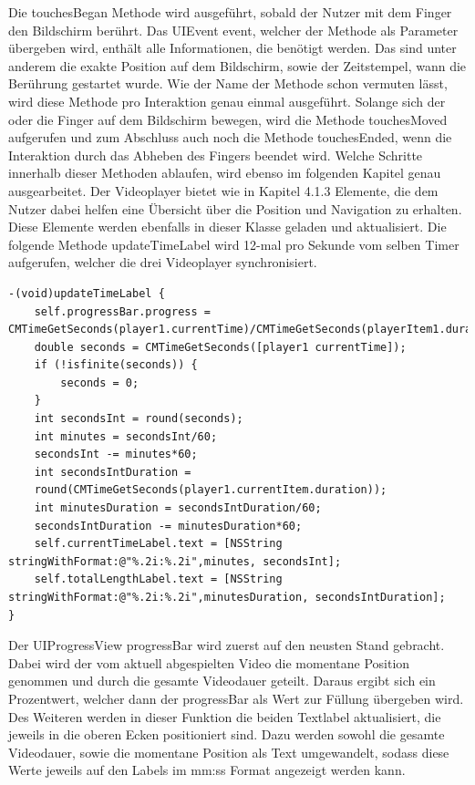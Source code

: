 \documentclass[11pt,a4paper]{report}
\begin{document}
Die touchesBegan Methode wird ausgeführt, sobald der Nutzer mit dem Finger den Bildschirm berührt. Das UIEvent event, welcher der Methode als Parameter übergeben wird, enthält alle Informationen, die benötigt werden. Das sind unter anderem die exakte Position auf dem Bildschirm, sowie der Zeitstempel, wann die Berührung gestartet wurde. Wie der Name der Methode schon vermuten lässt, wird diese Methode pro Interaktion genau einmal ausgeführt. Solange sich der oder die Finger auf dem Bildschirm bewegen, wird die Methode touchesMoved aufgerufen und zum Abschluss auch noch die Methode touchesEnded, wenn die Interaktion durch das Abheben des Fingers beendet wird. Welche Schritte innerhalb dieser Methoden ablaufen, wird ebenso im folgenden Kapitel genau ausgearbeitet. Der Videoplayer bietet wie in Kapitel 4.1.3 Elemente, die dem Nutzer dabei helfen eine Übersicht über die Position und Navigation zu erhalten. Diese Elemente werden ebenfalls in dieser Klasse geladen und aktualisiert. Die folgende Methode updateTimeLabel wird 12-mal pro Sekunde vom selben Timer aufgerufen, welcher die drei Videoplayer synchronisiert.

\begin{lstlisting}
-(void)updateTimeLabel {
    self.progressBar.progress = CMTimeGetSeconds(player1.currentTime)/CMTimeGetSeconds(playerItem1.duration);
    double seconds = CMTimeGetSeconds([player1 currentTime]);
    if (!isfinite(seconds)) {
        seconds = 0;
    }
    int secondsInt = round(seconds);
    int minutes = secondsInt/60;
    secondsInt -= minutes*60;
    int secondsIntDuration =
    round(CMTimeGetSeconds(player1.currentItem.duration));
    int minutesDuration = secondsIntDuration/60;
    secondsIntDuration -= minutesDuration*60;
    self.currentTimeLabel.text = [NSString stringWithFormat:@"%.2i:%.2i",minutes, secondsInt];
    self.totalLengthLabel.text = [NSString stringWithFormat:@"%.2i:%.2i",minutesDuration, secondsIntDuration];
}
\end{lstlisting}
Der UIProgressView progressBar wird zuerst auf den neusten Stand gebracht. Dabei wird der vom aktuell abgespielten Video die momentane Position genommen und durch die gesamte Videodauer geteilt. Daraus ergibt sich ein Prozentwert, welcher dann der progressBar als Wert zur Füllung übergeben wird. Des Weiteren werden in dieser Funktion die beiden Textlabel aktualisiert, die jeweils in die oberen Ecken positioniert sind. Dazu werden sowohl die gesamte Videodauer, sowie die momentane Position als Text umgewandelt, sodass diese Werte jeweils auf den Labels im mm:ss Format angezeigt werden kann.
\end{document}
